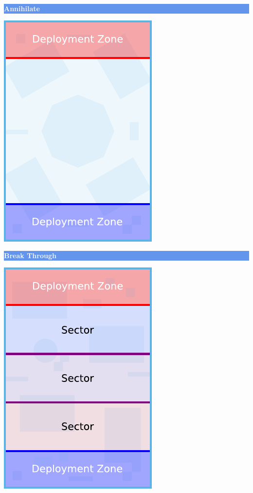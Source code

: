 \documentclass[14pt,dvipsnames]{extarticle}
\begin{document}
\hfill
\begin{minipage}{2in}\centering
\colorbox{CornflowerBlue}{\parbox[t][12pt]{\linewidth-2\fboxsep}{\centering\textcolor{White}{\textbf{Annihilate}}}}

\smallskip
\includegraphics[scale=0.9]{maps/map-annihilate}
\end{minipage}
\hfill
\begin{minipage}{2in}\centering
\colorbox{CornflowerBlue}{\parbox[t][12pt]{\linewidth}{\centering\textcolor{White}{\textbf{Break Through}}}}

\smallskip
\includegraphics[scale=0.9]{maps/map-breakthrough}
\end{minipage}
\end{document}
